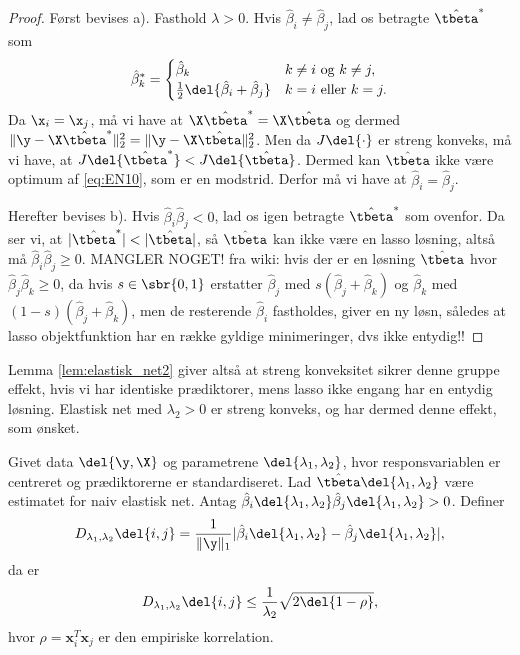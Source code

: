 \begin{proof}
Først bevises a).
Fasthold \(\lambda > 0\).
Hvis \(\hat{\beta}_i \neq \hat{\beta}_j\), lad os betragte \(\hat{\tbeta}^*\) som
\begin{align*}
\hat{\beta}_k^* = \begin{cases}
\hat{\beta}_k & k \neq i \text{ og } k \neq j, \\
\frac{1}{2} \del{\hat{\beta}_i + \hat{\beta}_j} & k = i \text{ eller } k = j.
\end{cases}
\end{align*}
Da \(\x_i = \x_j\), må vi have at \(\X \hat{\tbeta}^* = \X \hat{\tbeta}\) og dermed \(\Vert \y - \X \hat{\tbeta}^* \Vert_2^2 = \Vert \y - \X \hat{\tbeta} \Vert_2^2\).
Men da \(J \del{\cdot}\) er streng konveks, må vi have, at \(J \del{\hat{\tbeta}^*} < J \del{\hat{\tbeta}}\).
Dermed kan \(\hat{\tbeta}\) ikke være optimum af \eqref{eq:EN10}, som er en modstrid.
Derfor må vi have at \(\hat{\beta}_i = \hat{\beta}_j\).

Herefter bevises b).
Hvis \(\hat{\beta}_i \hat{\beta}_j < 0\), lad os igen betragte \(\hat{\tbeta}^*\) som ovenfor.
Da ser vi, at \(\vert \hat{\tbeta}^* \vert < \vert \hat{\tbeta} \vert\), så \(\hat{\tbeta}\) kan ikke være en lasso løsning, altså må \(\hat{\beta}_i \hat{\beta}_j \geq 0\).
MANGLER NOGET!
fra wiki: hvis der er en løsning \(\hat{\tbeta}\) hvor \(\hat{\beta}_j \hat{\beta}_k \geq 0\), da hvis \(s \in \sbr{0,1}\) erstatter \(\hat{\beta}_j\) med \(s (\hat{\beta}_j + \hat{\beta}_k)\) og \(\hat{\beta}_k\) med \( (1-s)(\hat{\beta}_j + \hat{\beta}_k)\), men de resterende \(\hat{\beta}_i\) fastholdes, giver en ny løsn, således at lasso objektfunktion har en række gyldige minimeringer, dvs ikke entydig!!   
\end{proof}
Lemma \ref{lem:elastisk_net2} giver altså at streng konveksitet sikrer denne gruppe effekt, hvis vi har identiske prædiktorer, mens lasso ikke engang har en entydig løsning.
Elastisk net med \(\lambda_2 > 0\) er streng konveks, og har dermed denne effekt, som ønsket.
%
\begin{thm} \label{thm:elastisk_net}
Givet data \(\del{\y, \X}\) og parametrene \(\del{\lambda_1, \lambda_2}\), hvor responsvariablen er centreret og prædiktorerne er standardiseret.
Lad \(\hat{\tbeta} \del{\lambda_1, \lambda_2}\) være estimatet for naiv elastisk net.
Antag \(\hat{\beta}_i \del{\lambda_1, \lambda_2} \hat{\beta}_j \del{\lambda_1, \lambda_2} > 0\).
Definer
\begin{align*}
D_{\lambda_1, \lambda_2} \del{i,j} = \frac{1}{\Vert \y \Vert_1} \vert \hat{\beta}_i \del{\lambda_1, \lambda_2} - \hat{\beta}_j \del{\lambda_1, \lambda_2} \vert,
\end{align*}
da er
\begin{align}
D_{\lambda_1, \lambda_2} \del{i,j} \leq \frac{1}{\lambda_2} \sqrt{2 \del{1-\rho}}, \label{eq:EN5}
\end{align}
hvor \(\rho = \mathbf{x}_i^T \mathbf{x}_j\) er den empiriske korrelation.
\end{thm}
